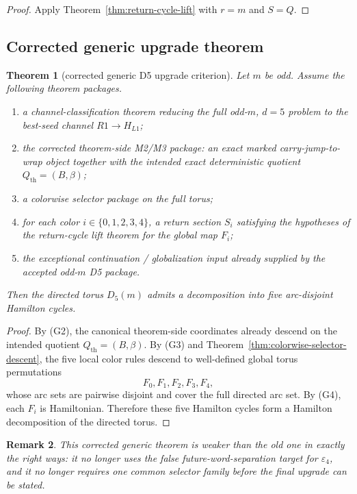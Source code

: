 \documentclass[11pt]{article}
\newtheorem{theorem}{Theorem}[section]
\newtheorem{remark}[theorem]{Remark}
\newcommand{\eps}{\varepsilon}
\begin{document}
\begin{proof}
Apply Theorem~\ref{thm:return-cycle-lift} with $r=m$ and $S=Q$.
\end{proof}

\subsection{Corrected generic upgrade theorem}

\begin{theorem}[corrected generic D5 upgrade criterion]
\label{thm:generic-upgrade}
Let $m$ be odd.
Assume the following theorem packages.
\begin{enumerate}[label=\textup{(G\arabic*)},leftmargin=2.9em]
\item a channel-classification theorem reducing the full odd-$m$, $d=5$
      problem to the best-seed channel $R1\to H_{L1}$;
\item the corrected theorem-side M2/M3 package: an exact marked carry-jump-to-wrap
      object together with the intended exact deterministic quotient
      $Q_{\mathrm{th}}=(B,\beta)$;
\item a colorwise selector package on the full torus;
\item for each color $i\in\{0,1,2,3,4\}$, a return section $S_i$ satisfying
      the hypotheses of the return-cycle lift theorem for the global map $F_i$;
\item the exceptional continuation / globalization input already supplied by the
      accepted odd-$m$ D5 package.
\end{enumerate}
Then the directed torus $D_5(m)$ admits a decomposition into five arc-disjoint
Hamilton cycles.
\end{theorem}

\begin{proof}
By (G2), the canonical theorem-side coordinates already descend on the intended
quotient $Q_{\mathrm{th}}=(B,\beta)$.
By (G3) and Theorem~\ref{thm:colorwise-selector-descent}, the five local color
rules descend to well-defined global torus permutations
\[
F_0,F_1,F_2,F_3,F_4,
\]
whose arc sets are pairwise disjoint and cover the full directed arc set.
By (G4), each $F_i$ is Hamiltonian.
Therefore these five Hamilton cycles form a Hamilton decomposition of the
directed torus.
\end{proof}

\begin{remark}
This corrected generic theorem is weaker than the old one in exactly the right
ways: it no longer uses the false future-word-separation target for $\eps_4$,
and it no longer requires one common selector family before the final upgrade
can be stated.
\end{remark}
\end{document}
